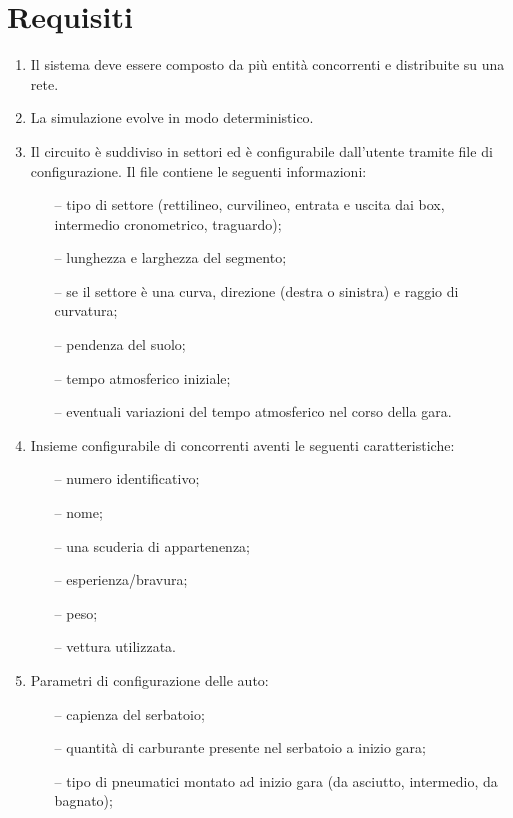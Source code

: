 \documentclass[11pt,a4paper]{report}
\begin{document}
\chapter{Requisiti}
\begin{enumerate}
    \item Il sistema deve essere composto da più entità concorrenti e distribuite su una rete.
    \item La simulazione evolve in modo deterministico.
    \item Il circuito è suddiviso in settori ed è configurabile dall'utente tramite file di configurazione. Il file contiene le seguenti informazioni:
    \begin{itemize}
        \item[--] tipo di settore (rettilineo, curvilineo, entrata e uscita dai box, intermedio cronometrico, traguardo);
        \item[--] lunghezza e larghezza del segmento;
        \item[--] se il settore è una curva, direzione (destra o sinistra) e raggio di curvatura;
        \item[--] pendenza del suolo;
        \item[--] tempo atmosferico iniziale;
        \item[--] eventuali variazioni del tempo atmosferico nel corso della gara.
    \end{itemize}
    \item Insieme configurabile di concorrenti aventi le seguenti caratteristiche:
    \begin{itemize}
	\item[--] numero identificativo;
	\item[--] nome;
        \item[--] una scuderia di appartenenza;
        \item[--] esperienza/bravura;
        \item[--] peso;
        \item[--] vettura utilizzata.
    \end{itemize}
    \item Parametri di configurazione delle auto:
    \begin{itemize}
        \item[--] capienza del serbatoio;
	\item[--] quantità di carburante presente nel serbatoio a inizio gara;
        \item[--] tipo di pneumatici montato ad inizio gara (da asciutto, intermedio, da bagnato);

\end{itemize}
\end{enumerate}
\end{document}
